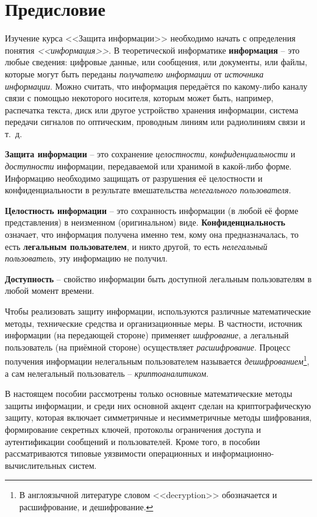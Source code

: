﻿\chapter*{Предисловие}

Изучение курса <<Защита информации>> необходимо начать с определения понятия \emph{<<информация>>}. В теоретической информатике \textbf{информация} -- это любые сведения: цифровые данные, или сообщения, или документы, или файлы, которые могут быть переданы \emph{получателю информации} от \emph{источника информации}. Можно считать, что информация передаётся по какому-либо каналу связи с помощью некоторого носителя, которым может быть, например, распечатка текста, диск или другое устройство хранения информации, система передачи сигналов по оптическим, проводным линиям или радиолиниям связи и т.~д.

\textbf{Защита информации} -- это сохранение \emph{целостности}, \emph{конфиденциальности} и \emph{доступности} информации, передаваемой или хранимой в какой-либо форме. Информацию необходимо защищать от разрушения её целостности и конфиденциальности в результате вмешательства \emph{нелегального пользователя}.

\textbf{Целостность информации} -- это сохранность информации (в любой её форме представления) в неизменном (оригинальном) виде. \textbf{Конфиденциальность} означает, что информация получена именно тем, кому она предназначалась, то есть \textbf{легальным пользователем}, и никто другой, то есть \emph{нелегальный пользователь}, эту информацию не получил.

\textbf{Доступность} -- свойство информации быть доступной легальным пользователям в любой момент времени.

Чтобы реализовать защиту информации, используются различные математические методы, технические средства и организационные меры. В частности, источник информации (на передающей стороне) применяет \emph{шифрование}, а легальный пользователь (на приёмной стороне) осуществляет \emph{расшифрование}. Процесс получения информации нелегальным пользователем называется \emph{дешифрованием}\footnote{В англоязычной литературе словом <<decryption>> обозначается и расшифрование, и дешифрование.}, а сам нелегальный пользователь -- \emph{криптоаналитиком}.

В настоящем пособии рассмотрены только основные математические методы защиты информации, и среди них основной акцент сделан на криптографическую защиту, которая включает симметричные и несимметричные методы шифрования, формирование секретных ключей, протоколы ограничения доступа и аутентификации сообщений и пользователей. Кроме того, в пособии рассматриваются типовые уязвимости операционных и информационно-вычислительных систем.

